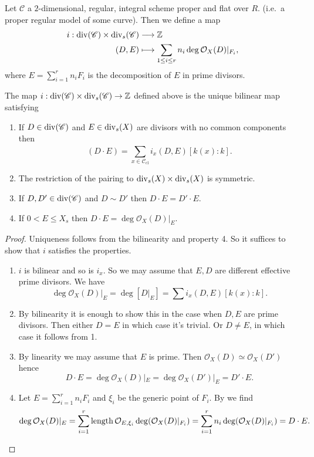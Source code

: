\begin{definition}
	Let $\mathscr C$ a $2$-dimensional, regular, integral scheme proper and flat over $R$.  (i.e.\ a proper regular model of some curve). 
	Then we define a map
	\begin{align*}
		i: \operatorname{div}(\mathscr C) \times \operatorname{div}_s(\mathscr C) &\longrightarrow \mathbb{Z} \\
		(D, E) &\longmapsto \sum_{1 \le i \le r} n_i \deg \mathcal O_X(D)|_{F_i}
	,\end{align*}
	where $E = \sum_{i = 1}^{r} n_i F_i$ is the decomposition of $E$ in prime divisors. 
\end{definition}
	

\begin{theorem}\label{thm:defining_properties_intersection_pairing}
	The map $i: \operatorname{div}(\mathscr C) \times \operatorname{div}_s(\mathscr C) \rightarrow \mathbb{Z} $ defined above is the unique bilinear map satisfying
	\begin{enumerate}
		\item If $D \in \operatorname{div}(\mathscr{C} )$ and $E \in \operatorname{div}_s(X)$ are divisors with no common components then  \[
				(D\cdot E) = \sum_{x \in \mathscr{C}_\text{cl} }^{} i_x(D, E)[k(x):k]
			.\] 
		\item The restriction of the pairing to $\operatorname{div} _s (X) \times  \operatorname{div}_s(X)$ is symmetric.
		\item If $D, D' \in \operatorname{div} (\mathscr C)$ and $D \sim D'$ then $D\cdot E = D' \cdot E$. 
		\item If $0 < E \le X_s$ then $D \cdot E = \deg \mathcal{O}_X(D) |_E$. 
	\end{enumerate}
\end{theorem}
\begin{proof}
	Uniqueness follows from the bilinearity and property 4.
	So it suffices to show that $i$ satisfies the properties. 
	\begin{enumerate}
		\item $i$ is bilinear and so is $i_x$. 
			So we may assume that $E, D$ are different effective prime divisors.
			We have \[
				\deg \mathcal{O}_X(D)|_E = \deg [D|_E] = \sum i_x (D, E) [k(x):k]
			.\] 
		\item By bilinearity it is enough to show this in the case when $D, E$ are prime divisors. 
			Then either $D = E$ in which case it's trivial. 
			Or $D \ne E$, in which case it follows from 1.
		\item By linearity we may assume that $E$ is prime. 
			Then $\mathcal{O}_X(D) \simeq \mathcal{O}_X(D')$ hence
			\[
				D \cdot E = \deg \mathcal{O}_X(D)|_E = \deg \mathcal{O}_X(D') |_E = D' \cdot E
			.\] 
		\item Let $E = \sum_{i = 1}^{r} n_i F_i$ and $\xi_i$ be the generic point of $F_i$. 
			By \cite[prop.\ 7.5.7]{liuAlgebraicGeometryArithmetic2002} we find \[
				\deg \mathcal{O}_{X}(D)|_E = \sum_{i = 1}^{r} \operatorname{length} \mathcal{O}_{E, \xi_i} \deg(\mathcal{O}_X(D)|_{F_i}) = \sum_{i = 1}^{r} n_i \deg(\mathcal{O}_X(D)|_{F_i}) = D \cdot E
		.\] 
	\end{enumerate}
\end{proof}

